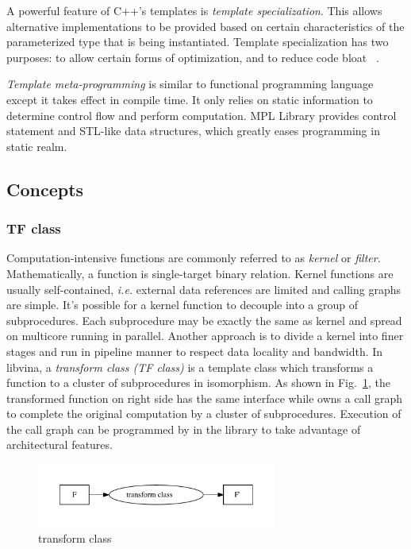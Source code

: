 \documentclass[10pt, conference, compsocconf]{IEEEtran}
\begin{document}
A powerful feature of C++'s templates is \emph{template specialization}. This allows alternative implementations to be provided based on certain characteristics of the parameterized type that is being instantiated. Template specialization has two purposes: to allow certain forms of optimization, and to reduce code bloat ~\cite{b18}.

\emph{Template meta-programming} is similar to functional programming language except it takes effect in compile time. It only relies on static information to determine control flow and perform computation. MPL Library \cite{b16} provides control statement and STL-like data structures, which greatly eases programming in static realm.

\subsection{Concepts}
\subsubsection{TF class}
Computation-intensive functions are commonly referred to as
\emph{kernel} or \emph{filter}. Mathematically, a function is
single-target binary relation. Kernel functions are usually
self-contained, \textit{i.e.} external data references are limited and
calling graphs are simple. It's possible for a kernel function to
decouple into a group of subprocedures. Each subprocedure may be
exactly the same as kernel and spread on multicore running in
parallel.  Another approach is to divide a kernel into finer stages
and run in pipeline manner to respect data locality and bandwidth. In
libvina, a \emph{transform class (TF class)} is a template class which
transforms a function to a cluster of subprocedures in isomorphism. As
shown in Fig.~\ref{fig:tfcls}, the transformed function on right side
has the same interface while owns a call graph to complete the
original computation by a cluster of subprocedures. Execution of the
call graph can be programmed by in the library to take advantage of
architectural features.

\begin{figure}
\centering
\includegraphics[width=3.1in]{map-class}
\caption{transform class}\label{fig:tfcls}
\end{figure}
\end{document}
